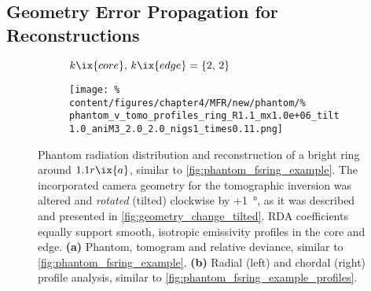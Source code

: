         \subsection{Geometry Error Propagation for Reconstructions}\label{eq:tomo_geo_error}%
%
            \begin{figure}[t]%
                \centering%
                \begin{subfigure}{\textwidth}%
                    \centering%
                    \caption{$k\ix{core},\,k\ix{edge}=\left\{2,\,2\right\}$}%
                \end{subfigure}%
                \newline%
                \begin{subfigure}{\textwidth}%
                    \centering%
                    \texttt{[image: \%
                        content/figures/chapter4/MFR/new/phantom/\%
                        phantom\_v\_tomo\_profiles\_ring\_R1.1\_mx1.0e+06\_tilt1.0\_aniM3\_2.0\_2.0\_nigs1\_times0.11.png]}%
                    \caption{}%
                \end{subfigure}%
                \caption{Phantom radiation distribution and reconstruction of a bright ring around $1.1r\ix{a}$, similar to \cref{fig:phantom_fsring_example}. The incorporated camera geometry  for the tomographic inversion was altered and \textit{rotated} (tilted) clockwise by +\SI{1}{\degree}, as it was described and presented in \cref{fig:geometry_change_tilted}. RDA coefficients equally support smooth, isotropic emissivity profiles in the core and edge. \textbf{(a)} Phantom, tomogram and relative deviance, similar to \cref{fig:phantom_fsring_example}. \textbf{(b)} Radial (left) and chordal (right) profile analysis, similar to \cref{fig:phantom_fsring_example_profiles}.}\label{fig:phantom_fsring_tilt_1deg}%
            \end{figure}%
%
